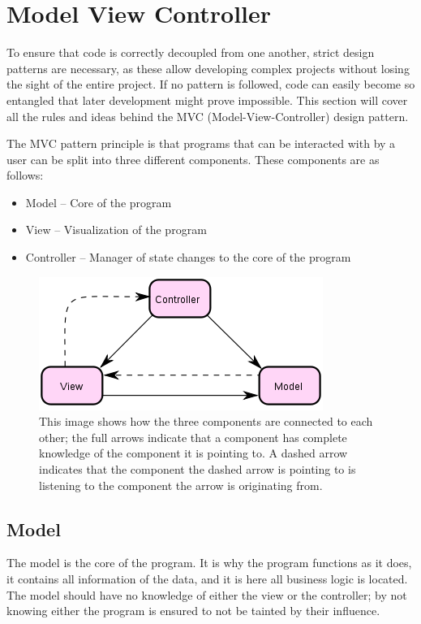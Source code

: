 
\section{Model View Controller}

To ensure that code is correctly decoupled from one another, strict
design patterns are necessary, as these allow developing complex projects
without losing the sight of the entire project. If no pattern is followed,
code can easily become so entangled that later development might prove
impossible. This section will cover all the rules and ideas behind
the MVC (Model-View-Controller) design pattern.

The MVC pattern principle is that programs that can be interacted
with by a user can be split into three different components. These
components are as follows:
\begin{itemize}
\item Model -- Core of the program
\item View -- Visualization of the program
\item Controller -- Manager of state changes to the core of the program
\end{itemize}
\begin{figure}
\centering{}\includegraphics{MVC}\caption{\label{fig:MVCBasic}This image shows how the three components are
connected to each other; the full arrows indicate that a component
has complete knowledge of the component it is pointing to. A dashed
arrow indicates that the component the dashed arrow is pointing to
is listening to the component the arrow is originating from. }
\end{figure}



\subsection{Model}

The model is the core of the program. It is why the program functions
as it does, it contains all information of the data, and it is here
all business logic is located. The model should have no knowledge
of either the view or the controller; by not knowing either the program
is ensured to not be tainted by their influence.

